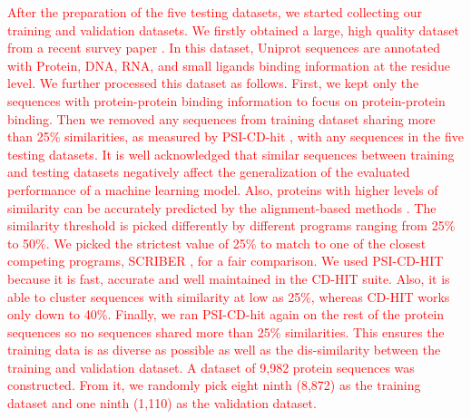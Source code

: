\documentclass{bioinfo}
\newcommand{\myColor}{red}
\begin{document}
\begin{methods}
\textcolor{\myColor}{
After the preparation of the five testing datasets, we started collecting our training and validation datasets. We firstly obtained a large, high quality dataset from a recent survey paper \citep{zhang2019comprehensive}. In this dataset, Uniprot sequences are annotated with Protein, DNA, RNA, and small ligands binding information at the residue level. We further processed this dataset as follows. First, we kept only the sequences with protein-protein binding information to focus on protein-protein binding. Then we removed any sequences from training dataset sharing more than 25\% similarities, as measured by PSI-CD-hit \citep{li2006cd,fu2012cd}, with any sequences in the five testing datasets. It is well acknowledged that similar sequences between training and testing datasets negatively affect the generalization of the evaluated performance of a machine learning model. Also, proteins with higher levels of similarity can be accurately predicted by the alignment-based methods \citep{zhang2018review}. The similarity threshold is picked differently by different programs ranging from 25\% to 50\%. We picked the strictest value of 25\% to match to one of the closest competing programs, SCRIBER \citep{zhang2019scriber}, for a fair comparison. We used PSI-CD-HIT because it is fast, accurate and well maintained in the CD-HIT suite. Also, it is able to cluster sequences with similarity at low as 25\%, whereas CD-HIT works only down to 40\%. Finally, we ran PSI-CD-hit again on the rest of the protein sequences so no sequences shared more than 25\% similarities. This ensures the training data is as diverse as possible as well as the dis-similarity between the training and validation dataset. A dataset of 9,982 protein sequences was constructed. From it, we randomly pick eight ninth (8,872) as the training dataset and one ninth (1,110) as the validation dataset. }


\end{methods}
\end{document}
